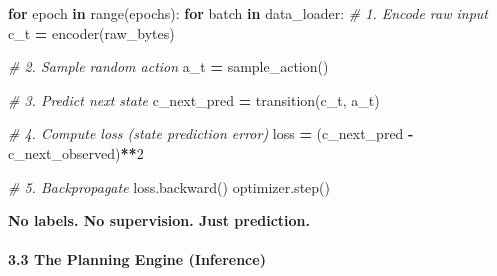 \documentclass[
  11pt,
  a4paper,
]{article}
\newenvironment{Shaded}{\begin{snugshade}}{\end{snugshade}}
\newcommand{\BuiltInTok}[1]{#1}
\newcommand{\CommentTok}[1]{\textcolor[rgb]{0.56,0.35,0.01}{\textit{#1}}}
\newcommand{\ControlFlowTok}[1]{\textcolor[rgb]{0.13,0.29,0.53}{\textbf{#1}}}
\newcommand{\DecValTok}[1]{\textcolor[rgb]{0.00,0.00,0.81}{#1}}
\newcommand{\KeywordTok}[1]{\textcolor[rgb]{0.13,0.29,0.53}{\textbf{#1}}}
\newcommand{\NormalTok}[1]{#1}
\newcommand{\OperatorTok}[1]{\textcolor[rgb]{0.81,0.36,0.00}{\textbf{#1}}}
\begin{document}
\begin{Shaded}
\begin{Highlighting}[]
\ControlFlowTok{for}\NormalTok{ epoch }\KeywordTok{in} \BuiltInTok{range}\NormalTok{(epochs):}
    \ControlFlowTok{for}\NormalTok{ batch }\KeywordTok{in}\NormalTok{ data\_loader:}
        \CommentTok{\# 1. Encode raw input}
\NormalTok{        c\_t }\OperatorTok{=}\NormalTok{ encoder(raw\_bytes)}
        
        \CommentTok{\# 2. Sample random action}
\NormalTok{        a\_t }\OperatorTok{=}\NormalTok{ sample\_action()}
        
        \CommentTok{\# 3. Predict next state}
\NormalTok{        c\_next\_pred }\OperatorTok{=}\NormalTok{ transition(c\_t, a\_t)}
        
        \CommentTok{\# 4. Compute loss (state prediction error)}
\NormalTok{        loss }\OperatorTok{=}\NormalTok{ (c\_next\_pred }\OperatorTok{{-}}\NormalTok{ c\_next\_observed)}\OperatorTok{**}\DecValTok{2}
        
        \CommentTok{\# 5. Backpropagate}
\NormalTok{        loss.backward()}
\NormalTok{        optimizer.step()}
\end{Highlighting}
\end{Shaded}

\textbf{No labels. No supervision. Just prediction.}

\paragraph{3.3 The Planning Engine
(Inference)}\label{the-planning-engine-inference}
\end{document}
